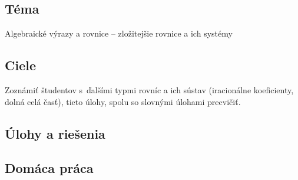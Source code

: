 

\subsection*{Téma}
Algebraické výrazy a rovnice -- zložitejšie rovnice a ich systémy


\subsection*{Ciele}
Zoznámiť študentov s~ďalšími typmi rovníc a ich sústav (iracionálne koeficienty, dolná celá časť), tieto úlohy, spolu so slovnými úlohami precvičiť.


\subsection*{Úlohy a riešenia}



















\subsection*{Domáca práca}







